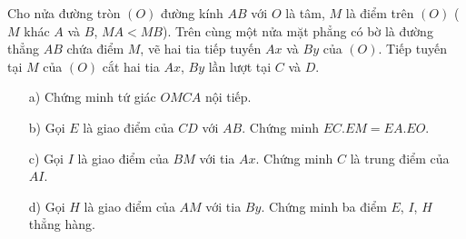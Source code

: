 \begin{ex}%
    Cho nửa đường tròn $(O)$ đường kính $ AB $ với $ O $ là tâm, $ M $ là điểm trên $ (O) $ ($ M $ khác $ A $ và $ B $, $ MA<MB $). Trên cùng một nửa mặt phẳng có bờ là đường thẳng $ AB $ chứa điểm $ M $, vẽ hai tia tiếp tuyến $ Ax $ và $ By $ của $ (O) $. Tiếp tuyến tại $ M $ của $ (O) $ cắt hai tia $ Ax $, $ By $ lần lượt tại $ C $ và $ D $.
    \begin{enumerate}
        \item[a)] Chứng minh tứ giác $ OMCA $ nội tiếp.
        \item[b)] Gọi $ E $ là giao điểm của $ CD $ với $ AB $. Chứng minh $ EC.EM=EA.EO $.
        \item[c)] Gọi $ I $ là giao điểm của $ BM $ với tia $ Ax $. Chứng minh $ C $ là trung điểm của $ AI $.
        \item[d)] Gọi $ H $ là giao điểm của $ AM $ với tia $ By $. Chứng minh ba điểm $ E $, $ I $, $ H $ thẳng hàng.
    \end{enumerate}
\loigiai
    

\end{ex}
